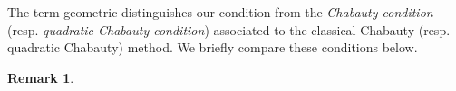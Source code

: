 \documentclass[11pt,oneside]{amsart}
\theoremstyle{plain}
\theoremstyle{definition}
\newtheorem{remark}[theorem]{Remark}
\DeclareMathOperator{\spec}{Spec} \DeclareMathOperator{\sgn}{sign}
\DeclareMathOperator{\rank}{rank} \DeclareMathOperator{\rig}{rig}
\def\Z{\mathbb{Z}}
\def\oh{\mathcal{O}}
\begin{document}
The term geometric distinguishes our condition from the {\it Chabauty condition} (resp. {\it quadratic Chabauty condition}) associated to the classical Chabauty (resp. quadratic Chabauty) method. We briefly compare these conditions below. 

\begin{remark} \label{remark:chabcondition}


\end{remark}
\end{document}
